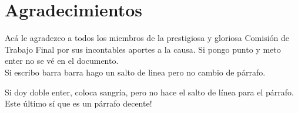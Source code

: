 \chapter*{Agradecimientos}
  Acá le agradezco a todos los miembros de la prestigiosa y gloriosa Comisión de Trabajo Final por sus incontables aportes a la causa.
  Si pongo punto y meto enter no se vé en el documento.\\
  Si escribo barra barra hago un salto de linea pero no cambio de párrafo.

  Si doy doble enter, coloca sangría, pero no hace el salto de línea para el párrafo.\\

  Este último sí que es un párrafo decente!
